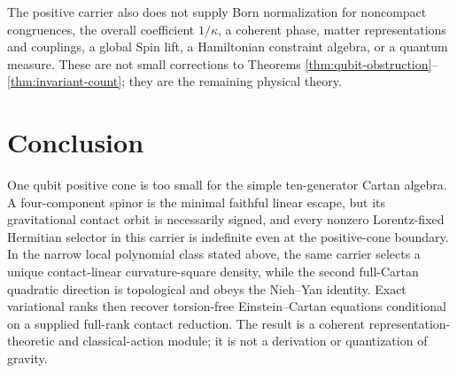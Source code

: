 \documentclass[11pt]{article}
\theoremstyle{remark}\newtheorem{remark}[theorem]{Remark}
\begin{document}
The positive carrier also does not supply Born normalization for noncompact congruences,
the overall coefficient $1/\kappa$, a coherent phase, matter representations and
couplings, a global Spin lift, a Hamiltonian constraint algebra, or a quantum measure.
These are not small corrections to Theorems \ref{thm:qubit-obstruction}--
\ref{thm:invariant-count}; they are the remaining physical theory.

\section{Conclusion}

One qubit positive cone is too small for the simple ten-generator Cartan algebra.  A
four-component spinor is the minimal faithful linear escape, but its gravitational contact
orbit is necessarily signed, and every nonzero Lorentz-fixed Hermitian
selector in this carrier is indefinite even at the positive-cone boundary.
In the narrow local polynomial class stated above, the same
carrier selects a unique contact-linear curvature-square density, while the second
full-Cartan quadratic direction is topological and obeys the Nieh--Yan identity.  Exact
variational ranks then recover torsion-free Einstein--Cartan equations conditional on a
supplied full-rank contact reduction.  The result is a coherent representation-theoretic
and classical-action module; it is not a derivation or quantization of gravity.




\end{document}

